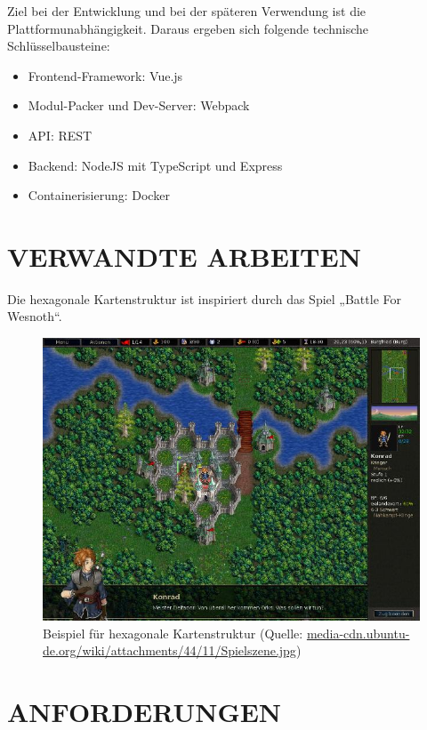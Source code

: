 \documentclass[letterpaper, 10 pt, conference]{ieeeconf}
\begin{document}
Ziel bei der Entwicklung und bei der späteren Verwendung ist die Plattformunabhängigkeit.  Daraus ergeben sich folgende technische Schlüsselbausteine:
\begin{itemize}
\item Frontend-Framework: Vue.js
\item Modul-Packer und Dev-Server: Webpack
\item API: REST
\item Backend: NodeJS mit TypeScript und Express
\item Containerisierung: Docker
\end{itemize}

\section{VERWANDTE ARBEITEN}
Die hexagonale Kartenstruktur ist inspiriert durch das Spiel „Battle For Wesnoth“.

\begin{figure}[thpb]
      \centering
      \includegraphics[scale=0.38]{images/spielszene}
      \caption{Beispiel für hexagonale Kartenstruktur (Quelle: \href{https://media-cdn.ubuntu-de.org/wiki/attachments/44/11/Spielszene.jpg}{media-cdn.ubuntu-de.org/wiki/attachments/44/11/Spielszene.jpg})}
      \label{figurelabel}
\end{figure}

\section{ANFORDERUNGEN}
\end{document}
